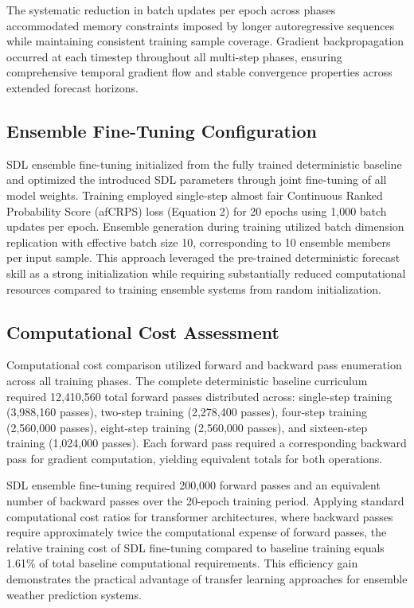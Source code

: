 \documentclass{agujournal2019}
\begin{document}
The systematic reduction in batch updates per epoch across phases accommodated memory constraints imposed by longer autoregressive sequences while maintaining consistent training sample coverage. Gradient backpropagation occurred at each timestep throughout all multi-step phases, ensuring comprehensive temporal gradient flow and stable convergence properties across extended forecast horizons.

\subsection{Ensemble Fine-Tuning Configuration}

SDL ensemble fine-tuning initialized from the fully trained deterministic baseline and optimized the introduced SDL parameters through joint fine-tuning of all model weights. Training employed single-step almost fair Continuous Ranked Probability Score (afCRPS) loss (Equation 2) for 20 epochs using 1,000 batch updates per epoch. Ensemble generation during training utilized batch dimension replication with effective batch size 10, corresponding to 10 ensemble members per input sample. This approach leveraged the pre-trained deterministic forecast skill as a strong initialization while requiring substantially reduced computational resources compared to training ensemble systems from random initialization.

\subsection{Computational Cost Assessment}

Computational cost comparison utilized forward and backward pass enumeration across all training phases. The complete deterministic baseline curriculum required 12,410,560 total forward passes distributed across: single-step training (3,988,160 passes), two-step training (2,278,400 passes), four-step training (2,560,000 passes), eight-step training (2,560,000 passes), and sixteen-step training (1,024,000 passes). Each forward pass required a corresponding backward pass for gradient computation, yielding equivalent totals for both operations.

SDL ensemble fine-tuning required 200,000 forward passes and an equivalent number of backward passes over the 20-epoch training period. Applying standard computational cost ratios for transformer architectures, where backward passes require approximately twice the computational expense of forward passes, the relative training cost of SDL fine-tuning compared to baseline training equals 1.61\% of total baseline computational requirements. This efficiency gain demonstrates the practical advantage of transfer learning approaches for ensemble weather prediction systems.
\end{document}
